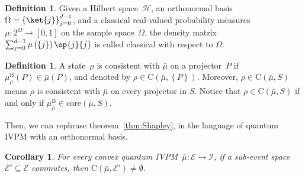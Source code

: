 \documentclass[12pt]{iopart}
\theoremstyle{plain}
\newtheorem{cor}[thm]{Corollary}
\theoremstyle{definition}
\newtheorem{definition}[thm]{Definition}
\theoremstyle{remark}
\newcommand{\Hilb}{\mathcal{H}}
\newcommand{\events}{\ensuremath{\mathcal{E}}}
\newcommand{\pmeas}{\ensuremath{\mu}}
\newcommand{\proj}[1]{\op{#1}{#1}}
\newcommand{\coreBorn}{\ensuremath{\mathrm{C}}}
\begin{document}
\begin{definition}Given a Hilbert space~$\Hilb$, an orthonormal
basis~$\Omega=\left\{ \ket{j}\right\} _{j=0}^{d-1}$, and a classical
real-valued probability measures~$\pmeas:2^{\Omega}\rightarrow\left[0,1\right]$
on the sample space~$\Omega$, the density matrix~$\sum_{j=0}^{d-1}\pmeas\left(\left\{ j\right\} \right)\proj{j}$
is called classical with respect to $\Omega$.\end{definition}

\begin{definition}\label{def:consistent-state}A state~$\rho$ is
consistent with $\bar{\mu}$ on a projector~$P$ if $\mu_{\rho}^{\mathrm{B}}\left(P\right)\in\bar{\mu}\left(P\right)$,
and denoted by $\rho\in\coreBorn\left(\bar{\mu},\left\{ P\right\} \right)$.
Moreover, $\rho\in\coreBorn\left(\bar{\mu},S\right)$ means $\rho$
is consistent with $\bar{\mu}$ on every projector in $S$. Notice
that $\rho\in\coreBorn\left(\bar{\mu},S\right)$ if and only if $\mu_{\rho}^{\mathrm{B}}\in\mathrm{core}\left(\bar{\mu},S\right)$.\end{definition}

Then, we can rephrase theorem~\ref{thm:Shapley}, in the language
of quantum IVPM with an orthonormal basis.

\begin{cor}For every convex quantum IVPM~$\bar{\mu}:\events\rightarrow\mathscr{I}$,
if a sub-event space~$\events'\subseteq\events$ commutes, then $\coreBorn\left(\bar{\mu},\events'\right)\ne\emptyset$.\end{cor}
\end{document}
